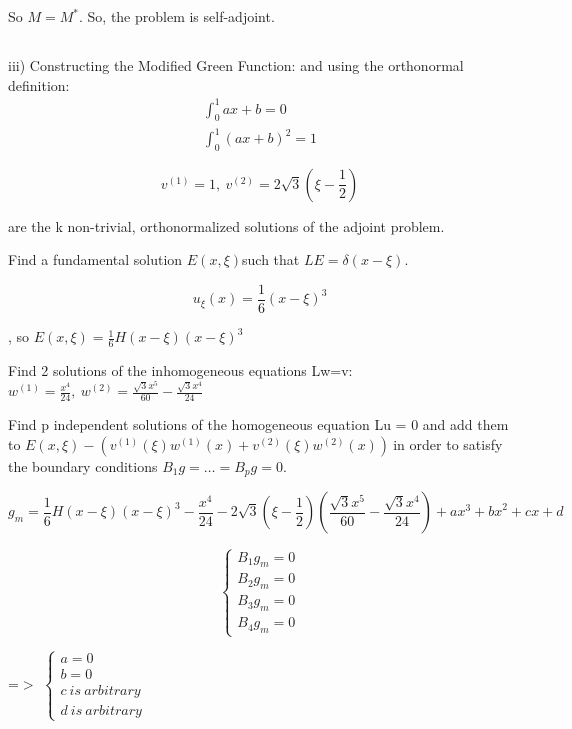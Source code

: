 \documentclass{article}
\begin{document}
So $M=M^*$. So, the problem is self-adjoint.
\subsection{}
iii) Constructing the Modified Green Function: and using the orthonormal definition:
\begin{align}
	\int_0^1 ax+b=0\\
	\int_0^1 (ax+b)^2 =1 
\end{align}

{\raggedright


\[
v^{\left(1\right)}=1,\ v^{\left(2\right)}=2\sqrt{3}(\xi{}-\frac{1}{2})
\]

are the k non-trivial, orthonormalized solutions of the adjoint problem.
}

{\raggedright
Find a fundamental solution $E\left(x,\xi{}\right)$such that
$LE=\delta{}(x-\xi{})$.
}

{\raggedright


\[
u_{\xi{}}\left(x\right)=\frac{1}{6}{\left(x-\xi{}\right)}^3
\]

, so $E\left(x,\xi{}\right)=\frac{1}{6}{H(x-\xi{})\left(x-\xi{}\right)}^3$
}

{\raggedright
Find 2 solutions of the inhomogeneous equations Lw=v:
$w^{\left(1\right)}=\frac{x^4}{24},\
w^{(2)}=\frac{\sqrt{3}x^5}{60}-\frac{\sqrt{3}x^4}{24}$
}

{\raggedright
Find p independent solutions of the homogeneous equation Lu = 0 and add them to
$E\left(x,\xi{}\right)-\left(v^{\left(1\right)}\left(\xi{}\right)w^{\left(1\right)}\left(x\right)+v^{\left(2\right)}\left(\xi{}\right)w^{\left(2\right)}\left(x\right)\right)\
$in order to satisfy the boundary conditions $B_1g=…=B_pg=0$.
}


\[
g_m=\frac{1}{6}{H\left(x-\xi{}\right)\left(x-\xi{}\right)}^3-\frac{x^4}{24}-2\sqrt{3}\left(\xi{}-\frac{1}{2}\right)\left(\frac{\sqrt{3}x^5}{60}-\frac{\sqrt{3}x^4}{24}\right)+{ax}^3+{bx}^2+cx+d
\]


{\raggedright


\[
\left\{\begin{array}{l}B_1g_m=0 \\
B_2g_m=0 \\
B_3g_m=0 \\
B_4g_m=0\end{array}\right.
\]

=$>$ $\left\{\begin{array}{l}a=0 \\
b=0 \\
c\ is\ arbitrary \\
d\ is\ arbitrary\end{array}\right.$
}
\end{document}
